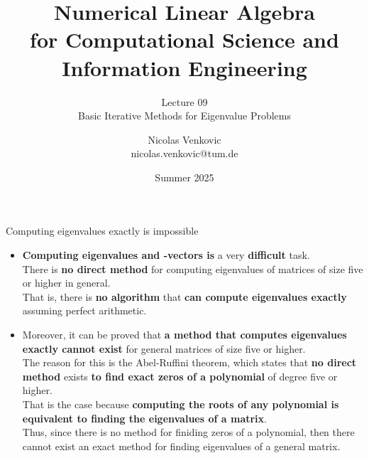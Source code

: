 \documentclass[t,usepdftitle=false]{beamer}
\title[NLA for CS and IE -- Lecture 09]{Numerical Linear Algebra\\for Computational Science and Information Engineering}
\subtitle{\vspace{.3cm}Lecture 09\\Basic Iterative Methods for Eigenvalue Problems}
\date[Summer 2025]{Summer 2025}
\author[nicolas.venkovic@tum.de]{Nicolas Venkovic\\{\small nicolas.venkovic@tum.de}}
\institute[]{Group of Computational Mathematics\\School of Computation, Information and Technology\\Technical University of Munich}
\begin{document}
	
\begin{frame}
	\maketitle
\end{frame}
	
\myoutlineframe

\begin{frame}{Computing eigenvalues exactly is impossible}
\begin{itemize}
\item \textbf{Computing eigenvalues and -vectors is} a very \textbf{difficult} task.\vspace{.1cm}\\
There is \textbf{no direct method} for computing eigenvalues of matrices of size five or higher in general.\vspace{.1cm}\\
That is, there is \textbf{no algorithm} that \textbf{can compute eigenvalues exactly} assuming perfect arithmetic.
\item Moreover, it can be proved that \textbf{a method that computes eigenvalues exactly cannot exist} for general matrices of size five or higher.\vspace{.1cm}\\
The reason for this is the Abel-Ruffini theorem, which states that \textbf{no direct method} exists \textbf{to find exact zeros of a polynomial} of degree five or higher.\vspace{.1cm}\\
That is the case because \textbf{computing the roots of any polynomial is equivalent to finding the eigenvalues of a matrix}.\vspace{.1cm}\\
Thus, since there is no method for finiding zeros of a polynomial, then there cannot exist an exact method for finding eigenvalues of a general matrix.
\end{itemize}
\end{frame}
\end{document}
